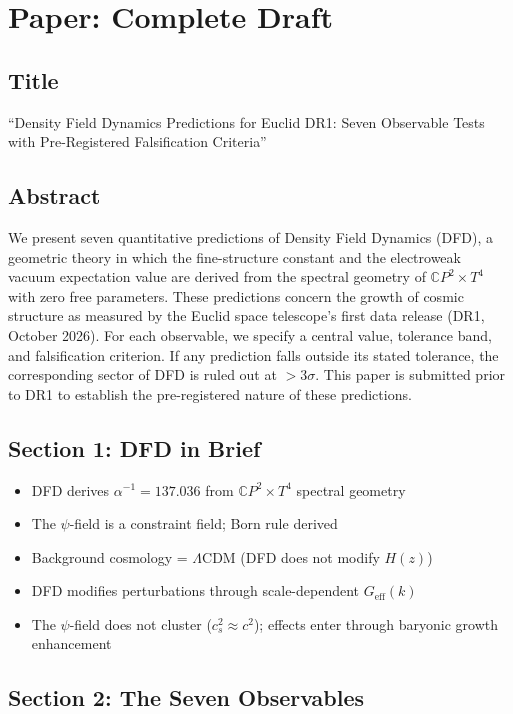 \documentclass[11pt,a4paper]{article}
\newcommand{\CP}{\mathbb{C}P}
\begin{document}
\section{Paper: Complete Draft}

\subsection{Title}

``Density Field Dynamics Predictions for Euclid DR1: Seven Observable Tests with Pre-Registered Falsification Criteria''

\subsection{Abstract}

We present seven quantitative predictions of Density Field Dynamics (DFD), a geometric theory in which the fine-structure constant and the electroweak vacuum expectation value are derived from the spectral geometry of $\CP^2 \times T^4$ with zero free parameters. These predictions concern the growth of cosmic structure as measured by the Euclid space telescope's first data release (DR1, October 2026). For each observable, we specify a central value, tolerance band, and falsification criterion. If any prediction falls outside its stated tolerance, the corresponding sector of DFD is ruled out at $> 3\sigma$. This paper is submitted prior to DR1 to establish the pre-registered nature of these predictions.

\subsection{Section 1: DFD in Brief}

\begin{itemize}
\item DFD derives $\alpha^{-1} = 137.036$ from $\CP^2 \times T^4$ spectral geometry
\item The $\psi$-field is a constraint field; Born rule derived
\item Background cosmology = $\Lambda$CDM (DFD does not modify $H(z)$)
\item DFD modifies perturbations through scale-dependent $G_{\mathrm{eff}}(k)$
\item The $\psi$-field does not cluster ($c_s^2 \approx c^2$); effects enter through baryonic growth enhancement
\end{itemize}

\subsection{Section 2: The Seven Observables}
\end{document}
